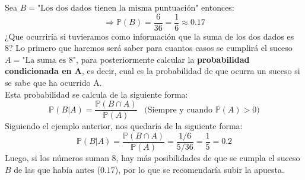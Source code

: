 \documentclass[11pt]{article}
\newcommand{\prob}{\mathbb{P}}
\theoremstyle{plain}
\begin{document}
        Sea $B = \text{"Los dos dados tienen la misma puntuación"}$ entonces:
        \[\Rightarrow \prob(B) = \frac{6}{36} = \frac{1}{6} \approx 0.17\]
        ¿Que ocurriría si tuvieramos como información que la suma de los dos dados es 8? Lo primero que haremos será saber para cuantos casos se cumplirá el suceso $A = \text{"La suma es 8"}$, para posteriormente calcular la \textbf{probabilidad condicionada en A}, es decir, cual es la probabilidad de que ocurra un suceso si se sabe que ha ocurrido A.\\

        Esta probabilidad se calcula de la siguiente forma:
        \begin{equation}\label{eq:23}
            \prob (B | A) = \frac{\prob(B \cap A)}{\prob(A)} \;\;\;\text{(Siempre y cuando $\prob(A) > 0$)}
        \end{equation}
        Siguiendo el ejemplo anterior, nos quedaría de la siguiente forma:
        \[\prob (B | A) = \frac{\prob(B \cap A)}{\prob(A)} = \frac{1/6}{5/36} = \frac{1}{5} = 0.2\]
        Luego, si los números suman 8, hay más posibilidades de que se cumpla el suceso $B$ de las que había antes ($0.17$), por lo que se recomendaría subir la apuesta.\\
\end{document}
